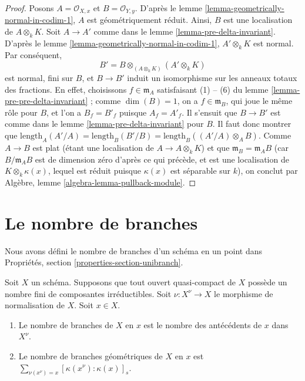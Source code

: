 \begin{proof}
Posons $A = \mathcal{O}_{X, x}$ et $B = \mathcal{O}_{Y, y}$.
D'après le lemme \ref{lemma-geometrically-normal-in-codim-1},
$A$ est géométriquement réduit.
Ainsi, $B$ est une localisation de $A \otimes_k K$.
Soit $A \to A'$ comme dans le lemme \ref{lemma-pre-delta-invariant}.
D'après le lemme \ref{lemma-geometrically-normal-in-codim-1},
$A' \otimes_k K$ est normal.
Par conséquent,
$$
B' = B \otimes_{(A \otimes_k K)} (A' \otimes_k K)
$$
est normal, fini sur $B$, et $B \to B'$ induit
un isomorphisme sur les anneaux totaux des fractions. En effet, choisissons $f \in \mathfrak m_A$
satisfaisant (1) -- (6) du lemme \ref{lemma-pre-pre-delta-invariant} ;
comme $\dim(B) = 1$, on a $f \in \mathfrak m_B$, qui
joue le même rôle pour $B$, et l'on a $B_f = B'_f$ puisque $A_f = A'_f$.
Il s'ensuit que $B \to B'$ est comme dans le lemme \ref{lemma-pre-delta-invariant}
pour $B$. Il faut donc montrer que
$\text{length}_A(A'/A) =
\text{length}_B(B'/B) = \text{length}_B((A'/A) \otimes_A B)$.
Comme $A \to B$ est plat (étant une localisation de $A \to A \otimes_k K$)
et que $\mathfrak m_B = \mathfrak m_A B$ (car
$B/\mathfrak m_A B$ est de dimension zéro d'après ce qui précède, et est
une localisation de $K \otimes_k \kappa(x)$, lequel est réduit puisque
$\kappa(x)$ est séparable sur $k$), on conclut par
Algèbre, lemme \ref{algebra-lemma-pullback-module}.
\end{proof}





\section{Le nombre de branches}
\label{section-number-of-branches}

\noindent
Nous avons défini le nombre de branches d'un schéma en un point
dans Propriétés, section \ref{properties-section-unibranch}.

\begin{lemma}
\label{lemma-number-of-branches}
Soit $X$ un schéma. Supposons que tout ouvert quasi-compact de $X$ possède
un nombre fini de composantes irréductibles. Soit $\nu : X^\nu \to X$
le morphisme de normalisation de $X$. Soit $x \in X$.
\begin{enumerate}
\item Le nombre de branches de $X$ en $x$ est le nombre des
antécédents de $x$ dans $X^\nu$.
\item Le nombre de branches géométriques de $X$ en $x$ est
$\sum_{\nu(x^\nu) = x} [\kappa(x^\nu) : \kappa(x)]_s$.
\end{enumerate}
\end{lemma}


